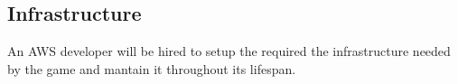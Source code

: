 ﻿\subsection{Infrastructure}

An AWS developer will be hired to setup the required the infrastructure needed by the game and mantain it throughout its lifespan.

